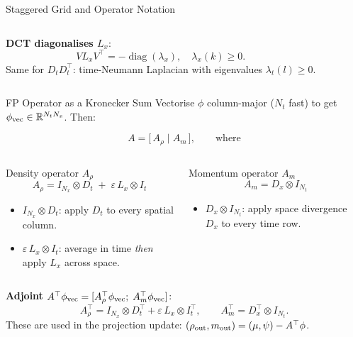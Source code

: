 \documentclass[10pt,aspectratio=169]{beamer}
\newcommand{\R}{\mathbb{R}}
\newcommand{\eps}{\varepsilon}
\newcommand{\lx}{\lambda_x}
\newcommand{\lt}{\lambda_t}
\newcommand{\Dt}{D_t}
\newcommand{\DtT}{D_t^{\!\top}}
\newcommand{\It}{I_t}
\newcommand{\ItT}{I_t^{\!\top}}
\newcommand{\Dx}{D_x}
\newcommand{\DxT}{D_x^{\!\top}}
\newcommand{\Lx}{L_x}
\newcommand{\kron}{\otimes}
\begin{document}
\begin{frame}{Staggered Grid and Operator Notation}
\begin{columns}[c]
    \vspace{4pt}
    \textbf{DCT diagonalises $\Lx$}:
    \[
      V \Lx V^\top = -\operatorname{diag}(\lx),
      \quad \lx(k) \geq 0.
    \]
    Same for $\Dt\DtT$: time-Neumann Laplacian with
    eigenvalues $\lt(l) \geq 0$.
  \end{columns}
\end{frame}

\begin{frame}{FP Operator as a Kronecker Sum}
  Vectorise $\phi$ column-major ($N_t$ fast) to get
  $\phi_{\rm vec} \in \R^{N_t N_x}$.  Then:

  \[
    A = \bigl[\,A_\rho \;\big|\; A_m\,\bigr],
    \qquad\text{where}
  \]

  \begin{columns}[c]
    \begin{block}{Density operator $A_\rho$}
    \[
      \boxed{A_\rho = I_{N_x}\kron \Dt \;+\; \eps\,\Lx\kron\It}
    \]
    \vspace{-4pt}
    \begin{itemize}
      \item $I_{N_x}\kron\Dt$: apply $\Dt$ to every spatial column.
      \item $\eps\,\Lx\kron\It$: average in time \emph{then} apply
            $\Lx$ across space.
    \end{itemize}
    \end{block}

    \begin{block}{Momentum operator $A_m$}
    \[
      \boxed{A_m = \Dx\kron I_{N_t}}
    \]
    \vspace{-4pt}
    \begin{itemize}
      \item $\Dx\kron I_{N_t}$: apply space divergence $\Dx$ to
            every time row.
    \end{itemize}
    \end{block}
  \end{columns}

  \bigskip
  \textbf{Adjoint} $A^\top\phi_{\rm vec} = [A_\rho^\top\phi_{\rm vec};\;A_m^\top\phi_{\rm vec}]$:
  \[
    A_\rho^\top = I_{N_x}\kron\DtT + \eps\,\Lx\kron\ItT,
    \qquad
    A_m^\top = \DxT\kron I_{N_t}.
  \]
  These are used in the projection update:
  $(\rho_{\rm out}, m_{\rm out}) = (\mu,\psi) - A^\top\phi$.
\end{frame}
\end{document}
